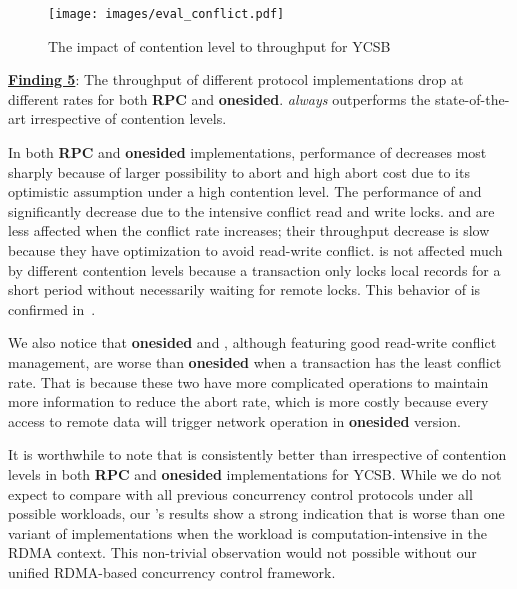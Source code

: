 \begin{figure}[htp]
    \centering
    \vspace{-0.2cm}
    \texttt{[image: images/eval\_conflict.pdf]}
    \vspace{-0.4cm}
    \caption{The impact of contention level to throughput for YCSB}
    \vspace{-0.8cm}
    \label{fig:eval_conflict_level}
\end{figure}

\underline{\bf Finding 5}: The throughput of different protocol implementations drop at different rates for both \textbf{RPC} and \textbf{onesided}. \mvcc \textit{always} outperforms the state-of-the-art \sundial irrespective of contention levels.

In both \textbf{RPC} and \textbf{onesided} implementations, performance of \occ decreases most sharply because of larger possibility to abort and high abort cost due to its optimistic assumption under a high contention level. The performance of \nowait and \waitdie significantly decrease due to the intensive conflict read and write locks. \mvcc and \sundial are less affected when the conflict rate increases; their throughput decrease is slow because they have optimization to avoid read-write conflict. \calvin is not affected much by different contention levels because a \calvin transaction only locks local records for a short period without necessarily waiting for remote locks. This behavior of \calvin is confirmed in~\cite{Thomson:2012:CFD:2213836.2213838}.

We also notice that \textbf{onesided} \sundial and \mvcc, although featuring good read-write conflict management, are worse than \textbf{onesided} \occ when a transaction has the least conflict rate. That is because these two have more complicated operations to maintain more information to reduce the abort rate, which is more costly because every access to remote data will trigger network operation in \textbf{onesided} version.


It is worthwhile to note that \mvcc is consistently better than \sundial irrespective of contention levels in both \textbf{RPC} and \textbf{onesided} implementations for YCSB. While we do not expect \cite{yu2018sundial} to compare with all previous concurrency control protocols under all possible workloads, our \projectname's results show a strong indication that \sundial is worse than one variant of \mvcc implementations when the workload is computation-intensive in the RDMA context. This non-trivial observation would not possible without our unified RDMA-based concurrency control framework. 

